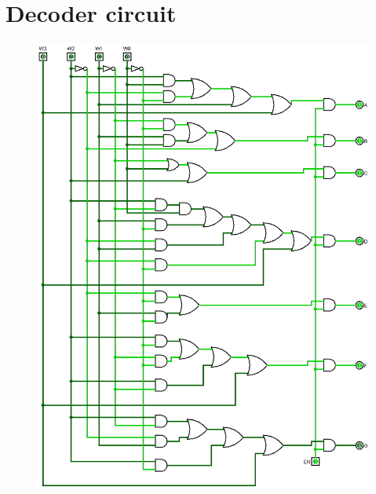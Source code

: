 \documentclass[12pt]{article}
\begin{document}
\section*{Decoder circuit}
\begin{center}
    \begin{figure}[ht]
        \includegraphics[scale=0.3]{decoder.png}
    \end{figure}
\end{center}
\newpage
\end{document}
